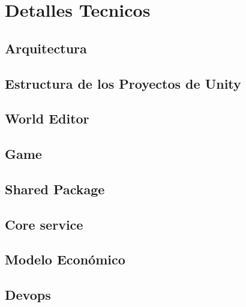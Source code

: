 \section{Detalles Tecnicos}



\subsection{Arquitectura}
\label{sec:architecture}


\subsection{Estructura de los Proyectos de Unity}
\label{sec:unity-structure}


\subsection{World Editor}


\subsection{Game}





\subsection{Shared Package}


\subsection{Core service}








\subsection{Modelo Económico}




\subsection{Devops}
\label{sec:devops}
